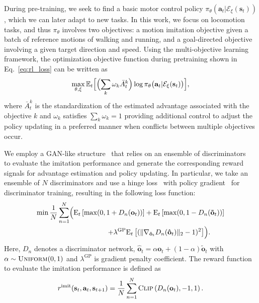 During pre-training, we seek to find a basic motor control %
policy 
$\pi_\theta(\mathbf{a}_t \vert \mathcal{E}_\xi(\mathbf{s}_t))$, 
which we can later adapt to new tasks. 
In this work, we focus on locomotion tasks, and thus $\pi_\theta$ involves two objectives: a motion imitation objective given a batch of reference motions of walking and running, and a goal-directed objective involving a given target direction and speed. %
Using the multi-objective learning framework, the optimization objective function during pretraining shown in Eq.~\ref{eq:rl_loss} can be written as 
\begin{equation}\label{eq:loss_pretraining}\begin{split}
    \max_{\theta, \xi} \mathbb{E}_t \Bigl[
    \Bigl(\sum_k \omega_k \bar{A}_t^k\Bigr)
    \log\pi_\theta\bigl(\mathbf{a}_t \vert \mathcal{E}_\xi(\mathbf{s}_t)\bigr) \Bigr],
\end{split}\end{equation}
where $\bar{A}_t^k$ is the standardization of the estimated advantage associated with the objective $k$ and $\omega_k$ satisfies $\sum_k \omega_k = 1$ providing additional control to adjust the policy updating in a preferred manner when conflicts between multiple objectives occur. %

We employ a GAN-like structure~\cite{ho2016generative,merel2017learning} that relies on an ensemble of discriminators~\cite{iccgan} to evaluate the imitation performance and generate the corresponding reward signals for advantage estimation and policy updating.
In particular, 
we take an ensemble of $N$ discriminators and use a hinge loss~\cite{lim2017geometric} with policy gradient~\cite{gulrajani2017improved} for discriminator training, resulting in the following loss function:  
\begin{equation}\label{eq:dis_loss}\begin{split}
    \min \frac{1}{N}\sum_{n=1}^{N}\Bigl( \mathrm{E}_t\left[\max(0, 1+D_n(\mathbf{o}_t))\right] + \mathrm{E}_t\left[\max(0, 1-D_n(\mathbf{\tilde{o}}_t))\right] \\
    + \lambda^{\text{GP}} \mathrm{E}_t\left[(\| \nabla_{\mathbf{\hat{o}}_t} D_n(\mathbf{\hat{o}}_t) \|_2 - 1)^2\right]\Bigr). \qquad
\end{split}\end{equation}
Here, $D_n$ denotes a discriminator network, $\mathbf{\hat{o}}_t = \alpha \mathbf{o}_t + (1-\alpha) \mathbf{\tilde{o}}_t$ with $\alpha \sim \textsc{Uniform}(0, 1)$
and $\lambda^{\text{GP}}$ is gradient penalty coefficient. 
The reward function to evaluate the imitation performance is defined as
\begin{equation}\label{eq:dis_rew}
    r^\text{imit}(\mathbf{s}_t, \mathbf{a}_t, \mathbf{s}_{t+1}) = \frac{1}{N} \sum_{n=1}^N \textsc{Clip}\left(D_n(\mathbf{o}_t), -1, 1\right).
\end{equation}

